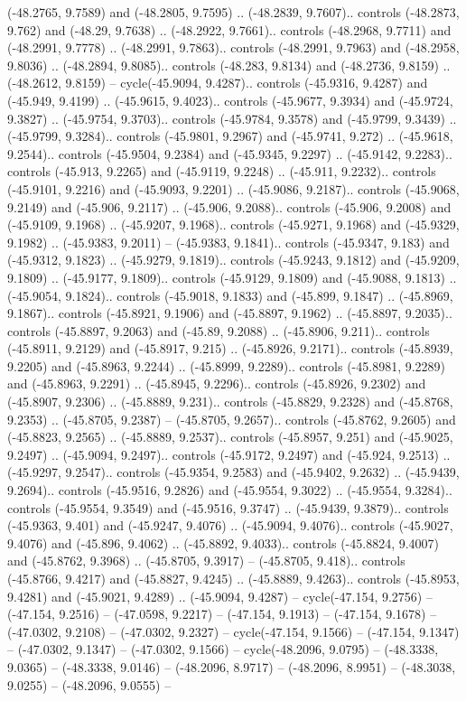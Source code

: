\begin{scope}[shift={(2.5552, 9.9912)}]
\begin{scope}[shift={(48.1654, -14.8546)}]
(-48.2765, 9.7589) and (-48.2805, 9.7595) .. (-48.2839, 9.7607).. controls (-48.2873, 9.762) and (-48.29, 9.7638) .. (-48.2922, 9.7661).. controls (-48.2968, 9.7711) and (-48.2991, 9.7778) .. (-48.2991, 9.7863).. controls (-48.2991, 9.7963) and (-48.2958, 9.8036) .. (-48.2894, 9.8085).. controls (-48.283, 9.8134) and (-48.2736, 9.8159) .. (-48.2612, 9.8159) -- cycle(-45.9094, 9.4287).. controls (-45.9316, 9.4287) and (-45.949, 9.4199) .. (-45.9615, 9.4023).. controls (-45.9677, 9.3934) and (-45.9724, 9.3827) .. (-45.9754, 9.3703).. controls (-45.9784, 9.3578) and (-45.9799, 9.3439) .. (-45.9799, 9.3284).. controls (-45.9801, 9.2967) and (-45.9741, 9.272) .. (-45.9618, 9.2544).. controls (-45.9504, 9.2384) and (-45.9345, 9.2297) .. (-45.9142, 9.2283).. controls (-45.913, 9.2265) and (-45.9119, 9.2248) .. (-45.911, 9.2232).. controls (-45.9101, 9.2216) and (-45.9093, 9.2201) .. (-45.9086, 9.2187).. controls (-45.9068, 9.2149) and (-45.906, 9.2117) .. (-45.906, 9.2088).. controls (-45.906, 9.2008) and (-45.9109, 9.1968) .. (-45.9207, 9.1968).. controls (-45.9271, 9.1968) and (-45.9329, 9.1982) .. (-45.9383, 9.2011) -- (-45.9383, 9.1841).. controls (-45.9347, 9.183) and (-45.9312, 9.1823) .. (-45.9279, 9.1819).. controls (-45.9243, 9.1812) and (-45.9209, 9.1809) .. (-45.9177, 9.1809).. controls (-45.9129, 9.1809) and (-45.9088, 9.1813) .. (-45.9054, 9.1824).. controls (-45.9018, 9.1833) and (-45.899, 9.1847) .. (-45.8969, 9.1867).. controls (-45.8921, 9.1906) and (-45.8897, 9.1962) .. (-45.8897, 9.2035).. controls (-45.8897, 9.2063) and (-45.89, 9.2088) .. (-45.8906, 9.211).. controls (-45.8911, 9.2129) and (-45.8917, 9.215) .. (-45.8926, 9.2171).. controls (-45.8939, 9.2205) and (-45.8963, 9.2244) .. (-45.8999, 9.2289).. controls (-45.8981, 9.2289) and (-45.8963, 9.2291) .. (-45.8945, 9.2296).. controls (-45.8926, 9.2302) and (-45.8907, 9.2306) .. (-45.8889, 9.231).. controls (-45.8829, 9.2328) and (-45.8768, 9.2353) .. (-45.8705, 9.2387) -- (-45.8705, 9.2657).. controls (-45.8762, 9.2605) and (-45.8823, 9.2565) .. (-45.8889, 9.2537).. controls (-45.8957, 9.251) and (-45.9025, 9.2497) .. (-45.9094, 9.2497).. controls (-45.9172, 9.2497) and (-45.924, 9.2513) .. (-45.9297, 9.2547).. controls (-45.9354, 9.2583) and (-45.9402, 9.2632) .. (-45.9439, 9.2694).. controls (-45.9516, 9.2826) and (-45.9554, 9.3022) .. (-45.9554, 9.3284).. controls (-45.9554, 9.3549) and (-45.9516, 9.3747) .. (-45.9439, 9.3879).. controls (-45.9363, 9.401) and (-45.9247, 9.4076) .. (-45.9094, 9.4076).. controls (-45.9027, 9.4076) and (-45.896, 9.4062) .. (-45.8892, 9.4033).. controls (-45.8824, 9.4007) and (-45.8762, 9.3968) .. (-45.8705, 9.3917) -- (-45.8705, 9.418).. controls (-45.8766, 9.4217) and (-45.8827, 9.4245) .. (-45.8889, 9.4263).. controls (-45.8953, 9.4281) and (-45.9021, 9.4289) .. (-45.9094, 9.4287) -- cycle(-47.154, 9.2756) -- (-47.154, 9.2516) -- (-47.0598, 9.2217) -- (-47.154, 9.1913) -- (-47.154, 9.1678) -- (-47.0302, 9.2108) -- (-47.0302, 9.2327) -- cycle(-47.154, 9.1566) -- (-47.154, 9.1347) -- (-47.0302, 9.1347) -- (-47.0302, 9.1566) -- cycle(-48.2096, 9.0795) -- (-48.3338, 9.0365) -- (-48.3338, 9.0146) -- (-48.2096, 8.9717) -- (-48.2096, 8.9951) -- (-48.3038, 9.0255) -- (-48.2096, 9.0555) -- 
\end{scope}
\end{scope}
